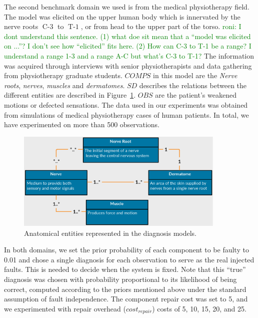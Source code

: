 \documentclass[review]{elsarticle}
\newcommand\meir[1]{\textcolor{red}{meir: #1}}
\newcommand\roni[1]{\textcolor{green}{roni: #1}}
\begin{document}
The second benchmark domain we used is from the medical physiotherapy field. The model was elicited on the upper human body which is innervated by the nerve roots $\operatorname{C-3}$ to $\operatorname{T-1}$, or from head to the upper part of the torso. 
\roni{I dont understand this sentence. (1) what doe sit mean that a ``model was elicited on ...''? I don't see how ``elicited'' fits here. 
(2) How can C-3 to T-1 be a range? I understand a range 1-3 and a range A-C but what's C-3 to T-1?}
The information was acquired through interviews with senior physiotherapists and data gathering from physiotherapy graduate students. $COMPS$ in this model are the \textit{Nerve roots}, \textit{nerves}, \textit{muscles} and \textit{dermatomes}. $SD$ describes the relations between the different entities are described in Figure~\ref{fig:entities}. $OBS$ are the patient's weakened motions or defected sensations. The data used in our experiments was obtained from simulations of medical physiotherapy cases of human patients. In total, we have experimented on more than 500 observations. 

\begin{figure}[h]
 \centering
 \includegraphics[width=10cm]{Entities.PNG}
 \caption{Anatomical entities represented in the diagnosis models.}
 \normalsize
        \label{fig:entities}
\end{figure}

 In both domains, we set the prior probability of each component to be faulty to 0.01 and chose a single diagnosis for each observation to serve as the real injected faults. This is needed to decide when the system is fixed. Note that this ``true'' diagnosis was chosen with probability proportional to its likelihood of being correct, computed according to the priors mentioned above under the standard assumption of fault independence. The component repair cost was set to 5, and we experimented with repair overhead ($cost_{repair}$) costs of 5, 10, 15, 20, and 25.
\end{document}
